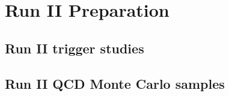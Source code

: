 \chapter{Run II Preparation}

\section{Run II trigger studies}

\section{Run II QCD Monte Carlo samples}
